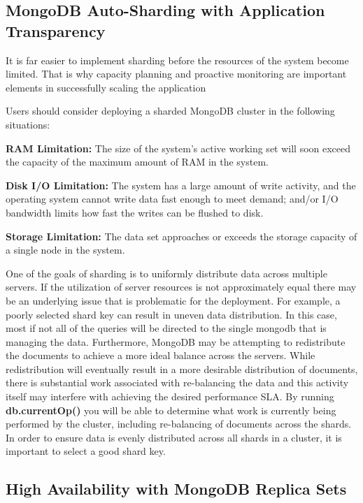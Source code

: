 \documentclass[9pt,twocolumn,twoside]{../../styles/osajnl}
\begin{document}
\subsection {MongoDB Auto-Sharding with Application Transparency}

It is far easier to implement sharding before the resources of the system become limited. That is why capacity planning and proactive monitoring are important elements in successfully scaling the application

Users should consider deploying a sharded MongoDB cluster in the following situations:

{\bfseries RAM Limitation:} The size of the system’s active working set will soon exceed the capacity of the maximum amount of RAM in the system.

{\bfseries Disk I/O Limitation:} The system has a large amount of write activity, and the operating system cannot write data fast enough to meet demand; and/or I/O bandwidth limits how fast the writes can be flushed to disk.

{\bfseries Storage Limitation:} The data set approaches or exceeds the storage capacity of a single node in the system.

One of the goals of sharding is to uniformly distribute data across multiple servers. If the utilization of server resources is not approximately equal there may be an underlying issue that is problematic for the deployment. For example, a poorly selected shard key can result in uneven data distribution. In this case, most if not all of the queries will be directed to the single mongodb that is managing the data.
Furthermore, MongoDB may be attempting to redistribute the documents to achieve a more ideal balance across the servers. While redistribution will eventually result in a more desirable distribution of documents, there is substantial work associated with re-balancing the data and this activity itself may interfere with achieving the desired performance SLA.
By running {\bfseries db.currentOp()} you will be able to determine what work is currently being performed by the cluster, including re-balancing of documents across the shards.
In order to ensure data is evenly distributed across all shards in a cluster, it is important to select a good shard key.

\subsection {High Availability with MongoDB Replica Sets}
\end{document}

